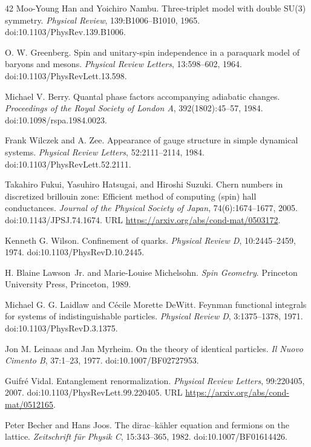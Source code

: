 \documentclass[11pt,letterpaper]{article}
\begin{document}
\begin{thebibliography}{42}
Moo-Young Han and Yoichiro Nambu.
Three-triplet model with double SU(3) symmetry.
\emph{Physical Review}, 139:B1006--B1010, 1965.
doi:10.1103/PhysRev.139.B1006.

O. W. Greenberg.
Spin and unitary-spin independence in a paraquark model of baryons and mesons.
\emph{Physical Review Letters}, 13:598--602, 1964.
doi:10.1103/PhysRevLett.13.598.

Michael V. Berry.
Quantal phase factors accompanying adiabatic changes.
\emph{Proceedings of the Royal Society of London A}, 392(1802):45--57, 1984.
doi:10.1098/rspa.1984.0023.

Frank Wilczek and A. Zee.
Appearance of gauge structure in simple dynamical systems.
\emph{Physical Review Letters}, 52:2111--2114, 1984.
doi:10.1103/PhysRevLett.52.2111.

Takahiro Fukui, Yasuhiro Hatsugai, and Hiroshi Suzuki.
Chern numbers in discretized brillouin zone: Efficient method of computing
(spin) hall conductances.
\emph{Journal of the Physical Society of Japan}, 74(6):1674--1677, 2005.
doi:10.1143/JPSJ.74.1674.
URL \url{https://arxiv.org/abs/cond-mat/0503172}.

Kenneth G. Wilson.
Confinement of quarks.
\emph{Physical Review D}, 10:2445--2459, 1974.
doi:10.1103/PhysRevD.10.2445.

H. Blaine Lawson~Jr. and Marie-Louise Michelsohn.
\emph{Spin Geometry}.
Princeton University Press, Princeton, 1989.

Michael G. G. Laidlaw and C\'ecile Morette DeWitt.
Feynman functional integrals for systems of indistinguishable particles.
\emph{Physical Review D}, 3:1375--1378, 1971.
doi:10.1103/PhysRevD.3.1375.

Jon M. Leinaas and Jan Myrheim.
On the theory of identical particles.
\emph{Il Nuovo Cimento B}, 37:1--23, 1977.
doi:10.1007/BF02727953.

Guifr\'e Vidal.
Entanglement renormalization.
\emph{Physical Review Letters}, 99:220405, 2007.
doi:10.1103/PhysRevLett.99.220405.
URL \url{https://arxiv.org/abs/cond-mat/0512165}.

Peter Becher and Hans Joos.
The dirac--k\"ahler equation and fermions on the lattice.
\emph{Zeitschrift f\"ur Physik C}, 15:343--365, 1982.
doi:10.1007/BF01614426.


\end{thebibliography}
\end{document}
